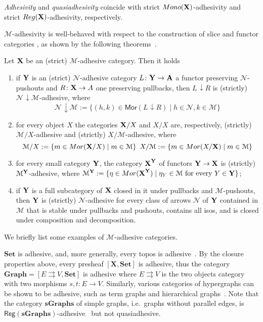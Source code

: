 \documentclass[a4paper,UKenglish,cleveref,pdftex,thm-restate,numberwithinsect]{lipics-v2021}
\newcommand{\cat}[1]{\ensuremath{\mathbf{#1}}}
\def\X{\textbf {\textup{X}}}
\def\Y{\textbf {\textup{Y}}}
\def\A{\textbf {\textup{A}}}
\newcommand{\comma}[2]{#1\hspace{1pt} {\downarrow}#2}
\newcommand{\mor}{\mathsf{Mor}}
\newcommand{\mon}{\mathsf{Mono}}
\newcommand{\reg}{\mathsf{Reg}}
\begin{document}
\begin{remark}
	\label{rem:salva}
	\emph{Adhesivity} and \emph{quasiadhesivity} 
	\cite{lack2005adhesive,garner2012axioms} coincide with strict
	$\mon(\X) $-adhesivity and strict $\reg(\X)$-adhesivity,
	respectively.
\end{remark}


$\mathcal{M}$-adhesivity is well-behaved with respect to  the construction of slice and functor categories \cite{mac2013categories}, as shown by the following theorems~\cite{ehrig2006fundamentals,lack2005adhesive}.

\begin{proposition}
	\label{thm:slice-functors}
	Let $\X$ be an (strict) $\mathcal{M}$-adhesive category. Then it holds
	\begin{enumerate}
		\item if $\Y$ is an (strict) $\mathcal{N}$-adhesive category $L\colon \Y\to \A$ a functor preserving $\mathcal{N}$-pushouts and $R\colon \X\to A$ one preserving pullbacks, then $\comma{L}{R}$ is (strictly) $\comma{\mathcal{N}}{\mathcal{M}}$-adhesive, where
		\[\comma{\mathcal{N}}{\mathcal{M}}:=\{(h,k) \in \mor(\comma{L}{R}) \mid h\in \mathcal{N}, k\in \mathcal{M}\}\]
		\item for every object $X$
		the categories $\X/X$  and $X/X$ are, respectively, (strictly) $\mathcal{M}/X$-adhesive and (strictly) $X/\mathcal{M}$-adhesive, where
		\[\mathcal{M}/X:=\{m\in \mor(\X/X) \mid m\in
		\mathcal{M}\} \hspace{5pt} X/\mathcal{M}:=\{m\in \mor(X/\X) \mid m\in \mathcal{M}\}\]
		\item for every small category $\Y$, the category $\X^\Y$ of
		functors $\Y\to \X$ is (strictly) $\mathcal{M}^{\Y}$-adhesive, where
		$\mathcal{M}^{\Y}:=\{\eta \in \mor(\X^\Y) \mid \eta_Y \in
		\mathcal{M} \text{ for every } Y\in \Y\}$;
		\item if $\Y$ is a full subcategory of $\X$ closed in it under pullbacks and $\mathcal{M}$-pushouts, then $\Y$ is (strictly) $\mathcal{N}$-adhesive for every class of arrows $\mathcal{N}$ of $\Y$ contained in $\mathcal{M}$ that is stable under pullbacks and pushouts, contains all isos, and is closed under composition and decomposition.
	\end{enumerate} 
\end{proposition}

We briefly list some examples of $\mathcal{M}$-adhesive categories.

\begin{example}
	\label{ex:adhesive}
	$\cat{Set}$ is adhesive, and, more generally, every topos is
	adhesive~\cite{lack2006toposes}. By the closure properties above, every presheaf $[\cat{X},\cat{Set}]$ is adhesive, thus the category
	$\cat{Graph} = [ E \rightrightarrows V, \cat{Set}]$ is adhesive
	where $E \rightrightarrows {V}$ is the two objects category with two
	morphisms $s,t \colon{E} \to {V}$. Similarly, various
	categories of hypergraphs can be shown to be adhesive, such as term
	graphs and hierarchical graphs~\cite{CastelnovoGM24}. Note that the category $\cat{sGraphs}$ of simple graphs, 
	i.e.~graphs without parallel edges, is
	$\reg{(\cat{sGraphs})}$-adhesive~\cite{BehrHK23} but not
	quasiadhesive.
\end{example}
\end{document}
